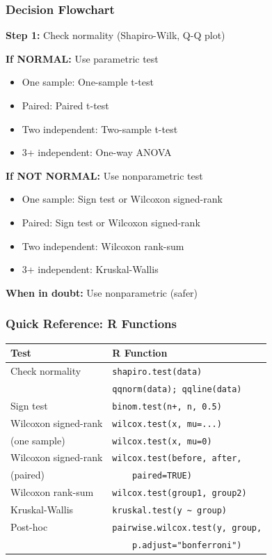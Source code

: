 \documentclass{beamer}
\begin{document}
\begin{frame}
\frametitle{Decision Flowchart}
\textbf{Step 1:} Check normality (Shapiro-Wilk, Q-Q plot)

\vspace{0.2cm}
\textbf{If NORMAL:} Use parametric test
\begin{itemize}\setlength\itemsep{-0.1em}
\item One sample: One-sample t-test
\item Paired: Paired t-test
\item Two independent: Two-sample t-test
\item 3+ independent: One-way ANOVA
\end{itemize}

\vspace{0.3cm}
\textbf{If NOT NORMAL:} Use nonparametric test
\begin{itemize}\setlength\itemsep{-0.1em}
\item One sample: Sign test or Wilcoxon signed-rank
\item Paired: Sign test or Wilcoxon signed-rank
\item Two independent: Wilcoxon rank-sum
\item 3+ independent: Kruskal-Wallis
\end{itemize}

\vspace{0.2cm}
\textbf{When in doubt:} Use nonparametric (safer)
\end{frame}

\begin{frame}
\frametitle{Quick Reference: R Functions}
\begin{center}
\begin{tabular}{ll}
\toprule
\textbf{Test} & \textbf{R Function} \\
\midrule
Check normality & \texttt{shapiro.test(data)} \\
 & \texttt{qqnorm(data); qqline(data)} \\
\midrule
Sign test & \texttt{binom.test(n+, n, 0.5)} \\
\midrule
Wilcoxon signed-rank & \texttt{wilcox.test(x, mu=...)} \\
(one sample) & \texttt{wilcox.test(x, mu=0)} \\
\midrule
Wilcoxon signed-rank & \texttt{wilcox.test(before, after,} \\
(paired) & \texttt{\ \ \ \ paired=TRUE)} \\
\midrule
Wilcoxon rank-sum & \texttt{wilcox.test(group1, group2)} \\
\midrule
Kruskal-Wallis & \texttt{kruskal.test(y \textasciitilde\ group)} \\
\midrule
Post-hoc & \texttt{pairwise.wilcox.test(y, group,} \\
 & \texttt{\ \ \ \ p.adjust="bonferroni")} \\
\bottomrule
\end{tabular}
\end{center}
\end{frame}
\end{document}
